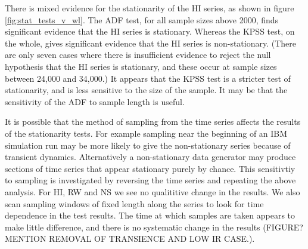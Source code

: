 There is mixed evidence for the stationarity of the HI series, as shown in figure \ref{fig:stat_tests_v_wl}. The ADF test, for all sample sizes above 2000, finds significant evidence that the HI series is stationary. Whereas the KPSS test, on the whole, gives significant evidence that the HI series is non-stationary. (There are only seven cases where there is insufficient evidence to reject the null hypothesis that the HI series is stationary, and these occur at sample sizes between 24,000 and 34,000.) It appears that the KPSS test is a stricter test of stationarity, and is less sensitive to the size of the sample. It may be that the sensitivity of the ADF to sample length is useful.

It is possible that the method of sampling from the time series affects the results of the stationarity tests. For example sampling near the beginning of an IBM simulation run may be more likely to give the non-stationary series because of transient dynamics. Alternatively a non-stationary data generator may produce sections of time series that appear stationary purely by chance. This sensitivtiy to sampling is investigated by reversing the time series and repeating the above analysis. For HI, RW and NS we see no qualititive change in the results. We also scan sampling windows of fixed length along the series to look for time dependence in the test results. The time at which samples are taken appears to make little difference, and there is no systematic change in the results (FIGURE? MENTION REMOVAL OF TRANSIENCE AND LOW IR CASE.).



